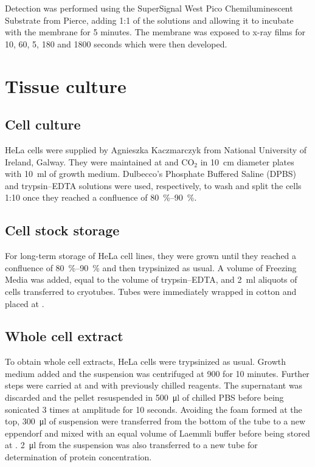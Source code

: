       Detection was performed using the SuperSignal West Pico Chemiluminescent
      Substrate from Pierce, adding 1:1 of the solutions and allowing it to incubate
      with the membrane for 5 minutes. The membrane was exposed to x-ray films for
      10, 60, 5, 180 and 1800 seconds which were then developed.


\section{Tissue culture}
  \subsection{Cell culture}
    HeLa cells were supplied by Agnieszka Kaczmarczyk from National University
    of Ireland, Galway. They were maintained at  and  CO$_2$ in \SI{10}{\cm}
    diameter plates with \SI{10}{\ml} of growth medium. Dulbecco's Phosphate Buffered
    Saline (DPBS) and trypsin--EDTA solutions were used, respectively, to wash
    and split the cells 1:10 once they reached a confluence of \SIrange{80}{90}{\percent}.

  \subsection{Cell stock storage}
    For long-term storage of HeLa cell lines, they were grown until they reached
    a confluence of \SIrange{80}{90}{\percent} and then trypsinized as usual. A volume of Freezing
    Media was added, equal to the volume of trypsin--EDTA, and \SI{2}{\ml} aliquots of
    cells transferred to cryotubes. Tubes were immediately wrapped in cotton and
    placed at .

  \subsection{Whole cell extract}
    \label{sec:cell-extract}
    To obtain whole cell extracts, HeLa cells were trypsinized as usual. Growth
    medium added and the suspension was centrifuged at \SI{900}{\gn} for 10 minutes. Further
    steps were carried at  and with previously chilled reagents. The supernatant
    was discarded and the pellet resuspended in \SI{500}{\ul} of chilled PBS before being
    sonicated 3 times at  amplitude for 10 seconds. Avoiding the foam formed at
    the top, \SI{300}{\ul} of suspension were transferred from the bottom of the tube to a
    new eppendorf and mixed with an equal volume of Laemmli buffer before being
    stored at . \SI{2}{\ul} from the suspension was also transferred to a new tube
    for determination of protein concentration.

